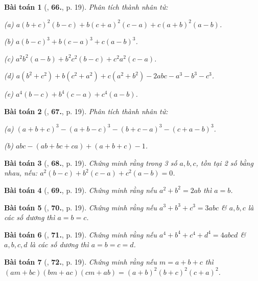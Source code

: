 \documentclass{article}
\numberwithin{equation}{section}
\newtheorem{baitoan}{Bài toán}[section]
\begin{document}
\begin{baitoan}[\cite{Binh_Toan_8_tap_1}, \textbf{66.}, p. 19]
	Phân tích thành nhân tử:
	\begin{enumerate*}
		\item[(a)] $a(b + c)^2(b - c) + b(c + a)^2(c - a) + c(a + b)^2(a - b)$.
		\item[(b)] $a(b - c)^3 + b(c - a)^3 + c(a - b)^3$.
		\item[(c)] $a^2b^2(a - b) + b^2c^2(b - c) + c^2a^2(c - a)$.
		\item[(d)] $a(b^2 + c^2) + b(c^2 + a^2) + c(a^2 + b^2) - 2abc - a^3 - b^3 - c^3$.
		\item[(e)] $a^4(b - c) + b^4(c - a) + c^4(a - b)$.
	\end{enumerate*}
\end{baitoan}

\begin{baitoan}[\cite{Binh_Toan_8_tap_1}, \textbf{67.}, p. 19]
	Phân tích thành nhân tử:
	\begin{enumerate*}
		\item[(a)] $(a + b + c)^3 - (a + b - c)^3 - (b + c - a)^3 - (c + a - b)^3$.
		\item[(b)] $abc - (ab + bc + ca) + (a + b + c) - 1$.
	\end{enumerate*}
\end{baitoan}

\begin{baitoan}[\cite{Binh_Toan_8_tap_1}, \textbf{68.}, p. 19]
	Chứng minh rằng trong 3 số $a,b,c$, tồn tại 2 số bằng nhau, nếu: $a^2(b - c) + b^2(c - a) + c^2(a - b) = 0$.
\end{baitoan}

\begin{baitoan}[\cite{Binh_Toan_8_tap_1}, \textbf{69.}, p. 19]
	Chứng minh rằng nếu $a^2 + b^2 = 2ab$ thì $a = b$.
\end{baitoan}

\begin{baitoan}[\cite{Binh_Toan_8_tap_1}, \textbf{70.}, p. 19]
	Chứng minh rằng nếu $a^3 + b^3 + c^3 = 3abc$ \& $a,b,c$ là các số dương thì $a = b = c$.
\end{baitoan}

\begin{baitoan}[\cite{Binh_Toan_8_tap_1}, \textbf{71.}, p. 19]
	Chứng minh rằng nếu $a^4 + b^4 + c^4 + d^4 = 4abcd$ \& $a,b,c,d$ là các số dương thì $a = b = c = d$.
\end{baitoan}

\begin{baitoan}[\cite{Binh_Toan_8_tap_1}, \textbf{72.}, p. 19]
	Chứng minh rằng nếu $m = a + b + c$ thì $(am + bc)(bm + ac)(cm + ab) = (a + b)^2(b + c)^2(c + a)^2$.
\end{baitoan}
\end{document}
